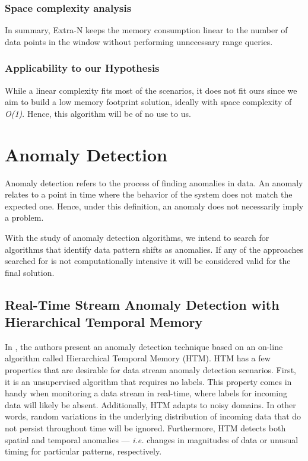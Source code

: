 \subsubsection{Space complexity analysis}
In summary, Extra-N keeps the memory consumption linear to the number of data points in the window without performing unnecessary range queries.

\subsubsection{Applicability to our Hypothesis}
While a linear complexity fits most of the scenarios, it does not fit ours since we aim to build a low memory footprint solution, ideally with space complexity of \textit{O(1)}. Hence, this algorithm will be of no use to us.


\section{Anomaly Detection}
Anomaly detection refers to the process of finding anomalies in data. An anomaly relates to a point in time where the behavior of the system does not match the expected one. Hence, under this definition, an anomaly does not necessarily imply a problem. 

With the study of anomaly detection algorithms, we intend to search for algorithms that identify data pattern shifts as anomalies. If any of the approaches searched for is not computationally intensive it will be considered valid for the final solution. 

\subsection{Real-Time Stream Anomaly Detection with Hierarchical Temporal Memory}

In \cite{Ahmad-HTM}, the authors present an anomaly detection technique based on an on-line algorithm called Hierarchical Temporal Memory (HTM). HTM has a few properties that are desirable for data stream anomaly detection scenarios. First, it is an unsupervised algorithm that requires no labels. This property comes in handy when monitoring a data stream in real-time, where labels for incoming data will likely be absent. Additionally, HTM adapts to noisy domains. In other words, random variations in the underlying distribution of incoming data that do not persist throughout time will be ignored. Furthermore, HTM detects both spatial and temporal anomalies --- \textit{i.e.} changes in magnitudes of data or unusual timing for particular patterns, respectively.   

